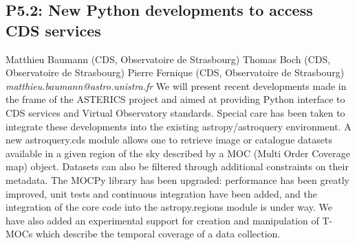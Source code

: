 \documentclass{report}
\begin{document}
\subsection*{P5.2: New Python developments to access CDS services}
\bigskip
Matthieu Baumann (CDS, Observatoire de Strasbourg) \newline Thomas Boch (CDS, Observatoire de Strasbourg) \newline  Pierre Fernique (CDS, Observatoire de Strasbourg)\newline   \newline  \newline  \newline\newline
{\it matthieu.baumann@astro.unistra.fr}\newline
\newline\newline
We will present recent developments made in the frame of the ASTERICS project and aimed at providing Python interface to CDS services and Virtual Observatory standards. Special care has been taken to integrate these developments into the existing astropy/astroquery environment.
A new astroquery.cds module allows one to retrieve image or catalogue datasets available in a given region of the sky described by a MOC (Multi Order Coverage map) object. Datasets can also be filtered through additional constraints on their metadata.
The MOCPy library has been upgraded: performance has been greatly improved, unit tests and continuous integration have been added, and the integration of the core code into the astropy.regions module is under way. We have also added an experimental support for creation and manipulation of T-MOCs which describe the temporal coverage of a data collection.\newline
\newpage
\end{document}
